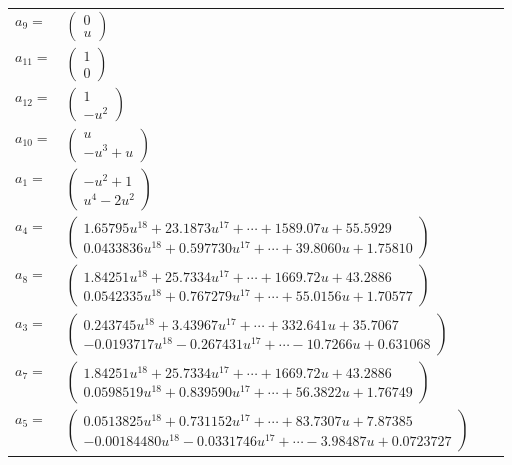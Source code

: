 \documentclass[1p]{elsarticle_modified}
\theoremstyle{definition}
\begin{document}
\begin{tabular}{m{7pt} m{180pt} m{7pt} m{180pt} }
\flushright $a_{9}=$&$\begin{pmatrix}0\\u\end{pmatrix}$ \\
\flushright $a_{11}=$&$\begin{pmatrix}1\\0\end{pmatrix}$ \\
\flushright $a_{12}=$&$\begin{pmatrix}1\\- u^2\end{pmatrix}$ \\
\flushright $a_{10}=$&$\begin{pmatrix}u\\- u^3+u\end{pmatrix}$ \\
\flushright $a_{1}=$&$\begin{pmatrix}- u^2+1\\u^4-2 u^2\end{pmatrix}$ \\
\flushright $a_{4}=$&$\begin{pmatrix}1.65795 u^{18}+23.1873 u^{17}+\cdots+1589.07 u+55.5929\\0.0433836 u^{18}+0.597730 u^{17}+\cdots+39.8060 u+1.75810\end{pmatrix}$ \\
\flushright $a_{8}=$&$\begin{pmatrix}1.84251 u^{18}+25.7334 u^{17}+\cdots+1669.72 u+43.2886\\0.0542335 u^{18}+0.767279 u^{17}+\cdots+55.0156 u+1.70577\end{pmatrix}$ \\
\flushright $a_{3}=$&$\begin{pmatrix}0.243745 u^{18}+3.43967 u^{17}+\cdots+332.641 u+35.7067\\-0.0193717 u^{18}-0.267431 u^{17}+\cdots-10.7266 u+0.631068\end{pmatrix}$ \\
\flushright $a_{7}=$&$\begin{pmatrix}1.84251 u^{18}+25.7334 u^{17}+\cdots+1669.72 u+43.2886\\0.0598519 u^{18}+0.839590 u^{17}+\cdots+56.3822 u+1.76749\end{pmatrix}$ \\
\flushright $a_{5}=$&$\begin{pmatrix}0.0513825 u^{18}+0.731152 u^{17}+\cdots+83.7307 u+7.87385\\-0.00184480 u^{18}-0.0331746 u^{17}+\cdots-3.98487 u+0.0723727\end{pmatrix}$ \\

\end{tabular}
\end{document}
